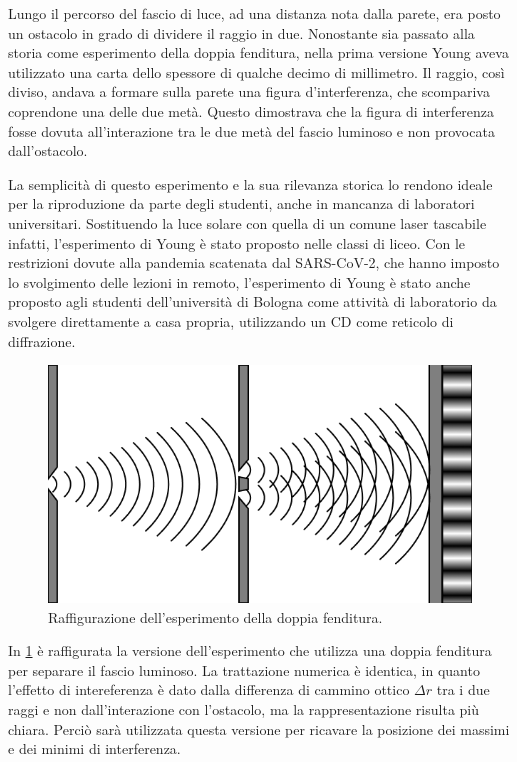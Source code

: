 \documentclass[12pt,a4paper]{report}
\begin{document}
Lungo il percorso del fascio di luce, ad una distanza nota dalla parete, era posto un ostacolo in grado di dividere il raggio in due. Nonostante sia passato alla storia come esperimento della doppia fenditura, nella prima versione Young aveva utilizzato una carta dello spessore di qualche decimo di millimetro. Il raggio, così diviso, andava a formare sulla parete una figura d'interferenza, che scompariva coprendone una delle due metà. Questo dimostrava che la figura di interferenza fosse dovuta all'interazione tra le due metà del fascio luminoso e non provocata dall'ostacolo.

La semplicità di questo esperimento e la sua rilevanza storica lo rendono ideale per la riproduzione da parte degli studenti, anche in mancanza di laboratori universitari. Sostituendo la luce solare con quella di un comune laser tascabile infatti, l'esperimento di Young è stato proposto nelle classi di liceo\cite{Scheider1986}. Con le restrizioni dovute alla pandemia scatenata dal SARS-CoV-2, che hanno imposto lo svolgimento delle lezioni in remoto, l'esperimento di Young è stato anche proposto agli studenti dell'università di Bologna come attività di laboratorio da svolgere direttamente a casa propria, utilizzando un CD come reticolo di diffrazione\cite{Campari2021}. 

\begin{figure}[!ht]
    \centering
    \includegraphics[width=\linewidth]{Immagini/double_slit_above.png}
    \captionsetup{width=.8\linewidth}
    \caption{Raffigurazione dell'esperimento della doppia fenditura.}
    \label{fig:doubleSlitAbove}
\end{figure}

In \cref{fig:doubleSlitAbove} è raffigurata la versione dell'esperimento che utilizza una doppia fenditura per separare il fascio luminoso. La trattazione numerica è identica, in quanto l'effetto di intereferenza è dato dalla differenza di cammino ottico \( \Delta r \) tra i due raggi e non dall'interazione con l'ostacolo, ma la rappresentazione risulta più chiara. Perciò sarà utilizzata questa versione per ricavare la posizione dei massimi e dei minimi di interferenza.
\end{document}
